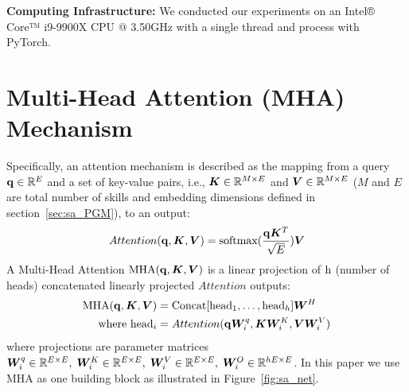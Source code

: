 \textbf{Computing Infrastructure:} We conducted our experiments
on an Intel® Core™ i9-9900X CPU @ 3.50GHz with a single thread
and process with PyTorch.

\section{Multi-Head Attention (MHA) Mechanism}
\label{sec:appen_mha}

Specifically, an attention mechanism is described as the mapping
from a query ${\mathbf{q}}\in{\mathbb{R}}^{E}$ and a set of key-value pairs, i.e.,
${\bm{K}}\in{\mathbb{R}}^{M\times E}$ and ${\bm{V}}\in{\mathbb{R}}^{M\times E}$ ($M$ and $E$
are total number of skills and embedding dimensions defined in
section~\ref{sec:sa_PGM}), to an output:
\begin{equation}
  \label{eq:sa_net_attn}
Attention({\mathbf{q}},{\bm{K}},{\bm{V}}) = \text{softmax}(\frac{{\mathbf{q}}{\bm{K}}^T}{\sqrt{E}}){\bm{V}}
\end{equation}
A Multi-Head Attention $\text{MHA}({\mathbf{q}},{\bm{K}},{\bm{V}})$ is a linear
projection of ${\textnormal{h}}$ (number of heads) concatenated linearly
projected $Attention$ outputs:
\begin{align}
  \label{sa:sa_net_mha}
  \text{MHA}({\mathbf{q}},{\bm{K}},{\bm{V}}) &= \text{Concat}[\text{head}_1,\ldots,\text{head}_h]{\bm{W}}^H\\
  \nonumber \text{where head}_i &= Attention({\mathbf{q}}{\bm{W}}_i^q,{\bm{K}}{\bm{W}}_i^K,{\bm{V}}{\bm{W}}_i^V)
\end{align}
where projections are parameter matrices ${\bm{W}}_i^q\in{\mathbb{R}}^{E\times
  E},\;{\bm{W}}_i^K\in{\mathbb{R}}^{E\times E},\;{\bm{W}}_i^V\in{\mathbb{R}}^{E\times
  E},\;{\bm{W}}_i^O\in{\mathbb{R}}^{hE\times E}$. In this paper we use MHA as
one building block as illustrated in
Figure~\ref{fig:sa_net}.


